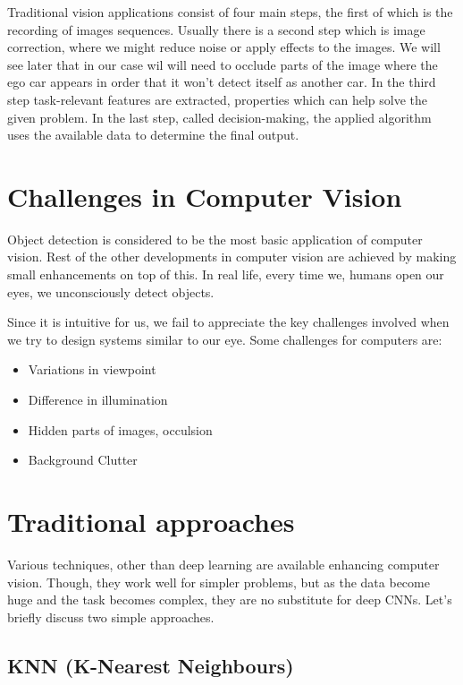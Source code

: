 Traditional vision applications consist of four main steps, the first of which
is the recording of images sequences. Usually there is a second step which is
image correction, where we might reduce noise or apply effects to the images. We
will see later that in our case wil will need to occlude parts of the image
where the ego car appears in order that it won't detect itself as another car.
In the third step task-relevant features are extracted, properties which can
help solve the given problem. In the last step, called decision-making, the
applied algorithm uses the available data to determine the final output.

\section{Challenges in Computer Vision}
Object detection is considered to be the most basic application of computer
vision. Rest of the other developments in computer vision are achieved by making
small enhancements on top of this. In real life, every time we, humans open our
eyes, we unconsciously detect objects.

Since it is intuitive for us, we fail to appreciate the key challenges involved
when we try to design systems similar to our eye. Some challenges for computers are:

\begin{itemize}
    \item Variations in viewpoint
    \item Difference in illumination
    \item Hidden parts of images, occulsion
    \item Background Clutter
\end{itemize}

\section{Traditional approaches}

Various techniques, other than deep learning are available enhancing computer
vision. Though, they work well for simpler problems, but as the data become huge
and the task becomes complex, they are no substitute for deep CNNs. Let’s
briefly discuss two simple approaches.

\subsection{KNN (K-Nearest Neighbours)}

